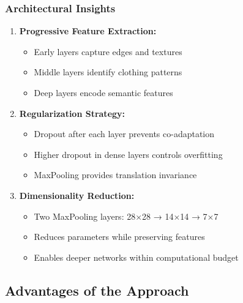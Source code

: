 \documentclass[12pt,a4paper]{article}
\begin{document}
\subsubsection{Architectural Insights}
\begin{enumerate}
    \item \textbf{Progressive Feature Extraction:}
    \begin{itemize}
        \item Early layers capture edges and textures
        \item Middle layers identify clothing patterns
        \item Deep layers encode semantic features
    \end{itemize}
    
    \item \textbf{Regularization Strategy:}
    \begin{itemize}
        \item Dropout after each layer prevents co-adaptation
        \item Higher dropout in dense layers controls overfitting
        \item MaxPooling provides translation invariance
    \end{itemize}
    
    \item \textbf{Dimensionality Reduction:}
    \begin{itemize}
        \item Two MaxPooling layers: 28×28 → 14×14 → 7×7
        \item Reduces parameters while preserving features
        \item Enables deeper networks within computational budget
    \end{itemize}
\end{enumerate}

\subsection{Advantages of the Approach}
\end{document}
